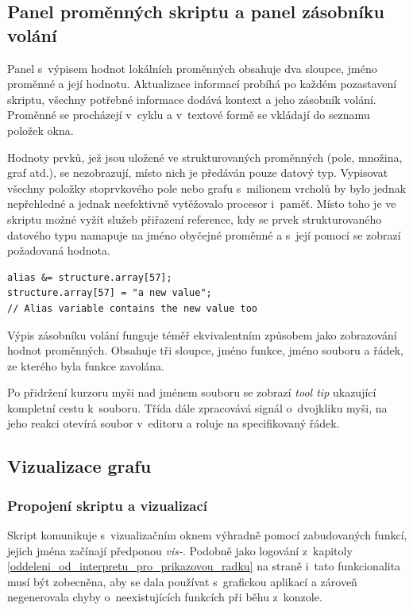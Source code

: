 \documentclass[11pt,twoside,a4paper]{book}
\begin{document}
\subsection{Panel proměnných skriptu a panel zásobníku volání}

Panel s~výpisem hodnot lokálních proměnných obsahuje dva sloupce, jméno proměnné a její hodnotu. Aktualizace informací probíhá po každém pozastavení skriptu, všechny potřebné informace dodává kontext a jeho zásobník volání. Proměnné se procházejí v~cyklu a v~textové formě se vkládají do seznamu položek okna.

Hodnoty prvků, jež jsou uložené ve strukturovaných proměnných (pole, množina, graf atd.), se nezobrazují, místo nich je předáván pouze datový typ. Vypisovat všechny položky stoprvkového pole nebo grafu s~milionem vrcholů by bylo jednak nepřehledné a jednak neefektivně vytěžovalo procesor i~paměť. Místo toho je ve skriptu možné vyžít služeb přiřazení reference, kdy se prvek strukturovaného datového typu namapuje na jméno obyčejné proměnné a s~její pomocí se zobrazí požadovaná hodnota.

\begin{verbatim}
alias &= structure.array[57];
structure.array[57] = "a new value";
// Alias variable contains the new value too
\end{verbatim}

Výpis zásobníku volání funguje téměř ekvivalentním způsobem jako zobrazování hodnot proměnných. Obsahuje tři sloupce, jméno funkce, jméno souboru a řádek, ze kterého byla funkce zavolána.

Po přidržení kurzoru myši nad jménem souboru se zobrazí \textit{tool tip} ukazující kompletní cestu k~souboru. Třída dále zpracovává signál o~dvojkliku myši, na jeho reakci otevírá soubor v~editoru a roluje na specifikovaný řádek.


\subsection{Vizualizace grafu}

\subsubsection{Propojení skriptu a vizualizací}

Skript komunikuje s~vizualizačním oknem výhradně pomocí zabudovaných funkcí, jejich jména začínají předponou \textit{vis-}. Podobně jako logování z~kapitoly \ref{oddeleni_od_interpretu_pro_prikazovou_radku} na straně \pageref{oddeleni_od_interpretu_pro_prikazovou_radku} i~tato funkcionalita musí být zobecněna, aby se dala používat s~grafickou aplikací a zároveň negenerovala chyby o~neexistujících funkcích při běhu z~konzole.
\end{document}
